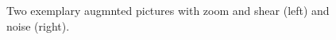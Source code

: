 \begin{figure}[H]
    \centering
    \begin{subfigure}{0.48\textwidth}
        \centering
    \end{subfigure}
    \hfill
    \begin{subfigure}{0.48\textwidth}
        \centering
    \end{subfigure}
    \caption{Two exemplary augmnted pictures with zoom and shear (left) and noise (right).}
    \label{fig:comp2}
\end{figure}
